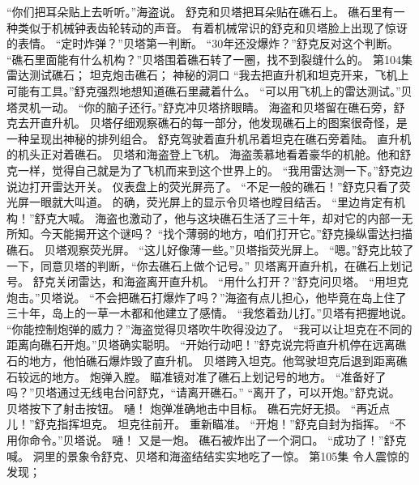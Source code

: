 \documentclass[a4paper,12pt,UTF8,twoside]{ctexbook}
\begin{document}
        “你们把耳朵贴上去听听。”海盗说。 
        舒克和贝塔把耳朵贴在礁石上。 
        礁石里有一种类似于机械钟表齿轮转动的声音。 
        有着机械常识的舒克和贝塔脸上出现了惊讶的表情。 
        “定时炸弹？”贝塔第一判断。 
        “30年还没爆炸？”舒克反对这个判断。 
        “礁石里面能有什么机构？”贝塔围着礁石转了一圈，找不到裂缝什么的。   第104集 
        雷达测试礁石； 
        坦克炮击礁石； 
        神秘的洞口   
        “我去把直升机和坦克开来，飞机上可能有工具。”舒克强烈地想知道礁石里藏着什么。 
        “可以用飞机上的雷达测试。”贝塔灵机一动。 
        “你的脑子还行。”舒克冲贝塔挤眼睛。 
        海盗和贝塔留在礁石旁，舒克去开直升机。 
        贝塔仔细观察礁石的每一部分，他发现礁石上的图案很奇怪，是一种呈现出神秘的排列组合。 
        舒克驾驶着直升机吊着坦克在礁石旁着陆。 
        直升机的机头正对着礁石。 
        贝塔和海盗登上飞机。 
        海盗羡慕地看着豪华的机舱。他和舒克一样，觉得自己就是为了飞机而来到这个世界上的。 
        “我用雷达测一下。”舒克边说边打开雷达开关。 
        仪表盘上的荧光屏亮了。 
        “不足一般的礁石！”舒克只看了荧光屏一眼就大叫道。 
        的确，荧光屏上的显示令贝塔也瞠目结舌。 
        “里边肯定有机构！”舒克大喊。 
        海盗也激动了，他与这块礁石生活了三十年，却对它的内部一无所知。今天能揭开这个谜吗？ 
        “找个薄弱的地方，咱们打开它。”舒克操纵雷达扫描礁石。 
        贝塔观察荧光屏。 
        “这儿好像薄一些。”贝塔指荧光屏上。 
        “嗯。”舒克比较了一下，同意贝塔的判断，“你去礁石上做个记号。” 
        贝塔离开直升机，在礁石上划记号。 
        舒克关闭雷达，和海盗离开直升机。 
        “用什么打开？”舒克问贝塔。 
        “用坦克炮击。”贝塔说。 
        “不会把礁石打爆炸了吗？”海盗有点儿担心，他毕竟在岛上住了三十年，岛上的一草一木都和他建立了感情。 
        “我悠着劲儿打。”贝塔有把握地说。 
        “你能控制炮弹的威力？”海盗觉得贝塔吹牛吹得没边了。 
        “我可以让坦克在不同的距离向礁石开炮。”贝塔确实聪明。 
        “开始行动吧！”舒克说完将直升机停在远离礁石的地方，他怕礁石爆炸毁了直升机。 
        贝塔跨入坦克。他驾驶坦克后退到距离礁石较远的地方。 
        炮弹入膛。 
        瞄准镜对准了礁石上划记号的地方。 
        “准备好了吗？”贝塔通过无线电台问舒克，“请离开礁石。” 
        “离开了，可以开炮。”舒克说。 
        贝塔按下了射击按钮。 
        嗵！ 
        炮弹准确地击中目标。 
        礁石完好无损。 
        “再近点儿！”舒克指挥坦克。 
        坦克往前开。 
        重新瞄准。 
        “开炮！”舒克自封为指挥。 
        “不用你命令。”贝塔说。 
        嗵！ 
        又是一炮。 
        礁石被炸出了一个洞口。 
        “成功了！”舒克喊。 
        洞里的景象令舒克、贝塔和海盗结结实实地吃了一惊。   第105集 
        令人震惊的发现； 
\end{document}
